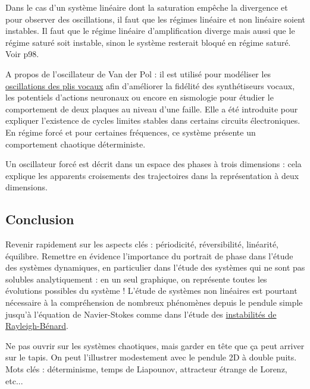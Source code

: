 \begin{remarque}
Dans le cas d'un système linéaire dont la saturation empêche la divergence et pour observer des oscillations, il faut que les régimes linéaire et non linéaire soient instables.
Il faut que le régime linéaire d'amplification diverge mais aussi que le régime saturé soit instable, sinon le système resterait bloqué en régime saturé.
Voir \cite{Neveu2019a} p98.

\noindent
A propos de l'oscillateur de Van der Pol : il est utilisé pour modéliser les \href{https://asa.scitation.org/doi/abs/10.1121/1.4798467}{oscillations des plis vocaux} afin d'améliorer la fidélité des synthétiseurs vocaux, les potentiels d'actions neuronaux ou encore en sismologie pour étudier le comportement de deux plaques au niveau d'une faille.
Elle a été introduite pour expliquer l'existence de cycles limites stables dans certains circuits électroniques.
En régime forcé et pour certaines fréquences, ce système présente un comportement chaotique déterministe.

\noindent
Un oscillateur forcé est décrit dans un espace des phases à trois dimensions : cela explique les apparents croisements des trajectoires dans la représentation à deux dimensions.
\end{remarque}

\subsection*{Conclusion}

Revenir rapidement sur les aspects clés : périodicité, réversibilité, linéarité, équilibre.
Remettre en évidence l'importance du portrait de phase dans l'étude des systèmes dynamiques, en particulier dans l'étude des systèmes qui ne sont pas solubles analytiquement : en un seul graphique, on représente toutes les évolutions possibles du système !
L'étude de systèmes non linéaires est pourtant nécessaire à la compréhension de nombreux phénomènes depuis le pendule simple jusqu'à l'équation de Navier-Stokes comme dans l'étude des \href{https://fr.wikipedia.org/wiki/Instabilit\%C3\%A9_de_Rayleigh-B\%C3\%A9nard}{instabilités de Rayleigh-Bénard}.

Ne pas ouvrir sur les systèmes chaotiques, mais garder en tête que ça peut arriver sur le tapis.
On peut l'illustrer modestement avec le pendule 2D à double puits.
Mots clés : déterminisme, temps de Liapounov, attracteur étrange de Lorenz, etc... 

\newpage